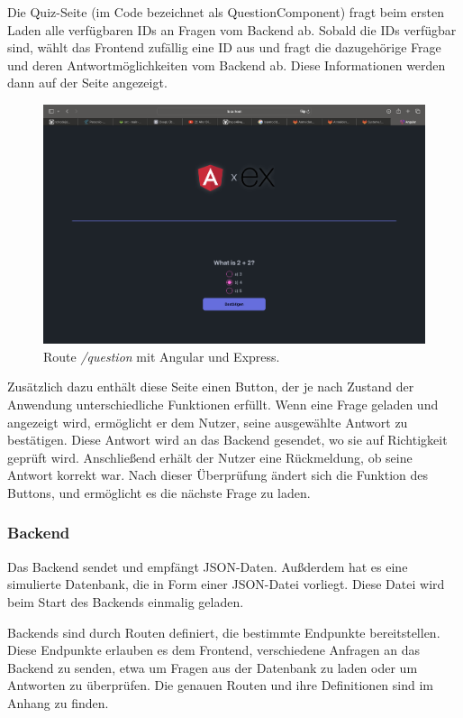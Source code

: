 \documentclass[biblatex]{lni}
\begin{document}
Die Quiz-Seite (im Code bezeichnet als QuestionComponent) fragt beim ersten Laden alle verfügbaren \ac{ID}s an Fragen vom Backend ab.
Sobald die \ac{ID}s verfügbar sind,
wählt das Frontend zufällig eine \ac{ID} aus und fragt die dazugehörige Frage und deren Antwortmöglichkeiten vom Backend ab.
Diese Informationen werden dann auf der Seite angezeigt.

\begin{figure}
  \centering
  \includegraphics[width=.8\textwidth]{question-component}
  \caption{Route \textit{/question} mit Angular und Express.}
  \label{fig:question-component}
\end{figure}

Zusätzlich dazu enthält diese Seite einen Button,
der je nach Zustand der Anwendung unterschiedliche Funktionen erfüllt.
Wenn eine Frage geladen und angezeigt wird, ermöglicht er dem Nutzer,
seine ausgewählte Antwort zu bestätigen.
Diese Antwort wird an das Backend gesendet, wo sie auf Richtigkeit geprüft wird.
Anschließend erhält der Nutzer eine Rückmeldung, ob seine Antwort korrekt war.
Nach dieser Überprüfung ändert sich die Funktion des Buttons, und ermöglicht es die nächste Frage zu laden.

\subsubsection{Backend}

Das Backend sendet und empfängt \ac{JSON}-Daten.
Außderdem hat es eine simulierte Datenbank, die in Form einer \ac{JSON}-Datei vorliegt.
Diese Datei wird beim Start des Backends einmalig geladen.

Backends sind durch Routen definiert, die bestimmte Endpunkte bereitstellen.
Diese Endpunkte erlauben es dem Frontend, verschiedene Anfragen an das Backend zu senden, etwa um Fragen aus der Datenbank zu laden oder um Antworten zu überprüfen.
Die genauen Routen und ihre Definitionen sind im Anhang zu finden.
\end{document}
